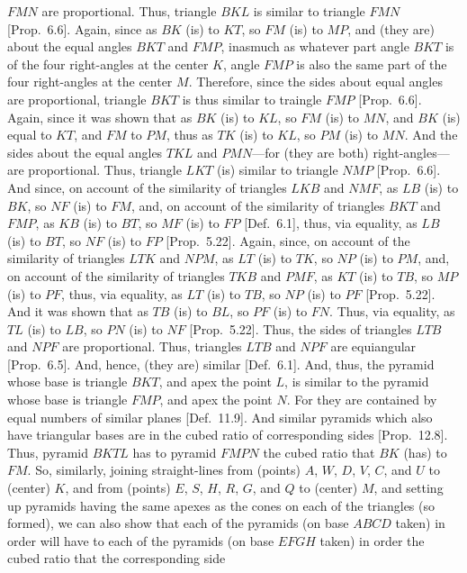 \begin{Parallel}{}{}
{$FMN$ are proportional. Thus, triangle $BKL$ is similar to triangle $FMN$
[Prop.~6.6]. Again, since as $BK$ (is) to $KT$, so
$FM$ (is) to $MP$, and (they are) about the equal angles $BKT$ and $FMP$, inasmuch as whatever part angle $BKT$
is of the four right-angles at the center $K$, angle $FMP$ is also the same part of the four right-angles at the  center $M$. 
Therefore, since the sides about equal angles are proportional,  triangle $BKT$ is thus similar to traingle $FMP$ [Prop.~6.6].
Again, since it was shown that as $BK$ (is) to $KL$, so $FM$ (is) to $MN$, and $BK$ (is) equal to $KT$, and
$FM$ to $PM$, thus as $TK$ (is) to $KL$, so $PM$ (is) to $MN$. And the sides about the equal angles
$TKL$ and $PMN$---for (they are both) right-angles---are proportional.  Thus, triangle $LKT$ (is) similar to
triangle $NMP$ [Prop.~6.6]. And since, on account of the similarity of triangles $LKB$ and
$NMF$, as $LB$ (is) to $BK$, so $NF$ (is) to $FM$, and, on account of the  similarity of triangles $BKT$ and
$FMP$, as $KB$ (is) to $BT$, so $MF$ (is) to $FP$ [Def.~6.1], thus, via equality, as $LB$ (is)
to $BT$, so $NF$ (is) to $FP$ [Prop.~5.22]. Again, since, on account of the similarity of
triangles $LTK$ and $NPM$, as $LT$ (is) to $TK$, so $NP$ (is) to $PM$, and, on account of the similarity of
triangles $TKB$ and $PMF$, as $KT$ (is) to $TB$, so $MP$ (is) to $PF$, thus, via equality,  as $LT$ (is) to $TB$, so
$NP$ (is) to $PF$ [Prop.~5.22]. And it was shown that as $TB$ (is) to $BL$, so $PF$ (is) to $FN$.
 Thus, via equality, as $TL$ (is) to $LB$, so $PN$ (is) to $NF$ [Prop.~5.22]. Thus, the sides of triangles
 $LTB$ and $NPF$ are proportional. Thus, triangles $LTB$ and $NPF$ are equiangular [Prop.~6.5]. 
 And, hence, (they are) similar [Def.~6.1]. And, thus, the pyramid whose base is triangle $BKT$, and
 apex the point $L$, is similar to the pyramid whose base is triangle $FMP$, and apex the point $N$. For they are contained
 by equal numbers of similar planes [Def.~11.9]. And similar pyramids which also have triangular
 bases are in the cubed ratio of corresponding sides [Prop.~12.8]. Thus, pyramid
 $BKTL$ has to pyramid $FMPN$ the cubed ratio that $BK$ (has) to $FM$. So, similarly, joining
 straight-lines from (points) $A$, $W$, $D$, $V$, $C$, and $U$ to (center) $K$, and from (points) $E$, $S$, $H$, $R$,
 $G$,  and $Q$ to (center) $M$, and setting up pyramids having the same apexes as the cones on each of the triangles (so formed), we can also show
 that each of the pyramids (on base $ABCD$ taken) in order will have to each of the pyramids (on base $EFGH$ taken) in order the cubed ratio that the corresponding side
}
\end{Parallel}
